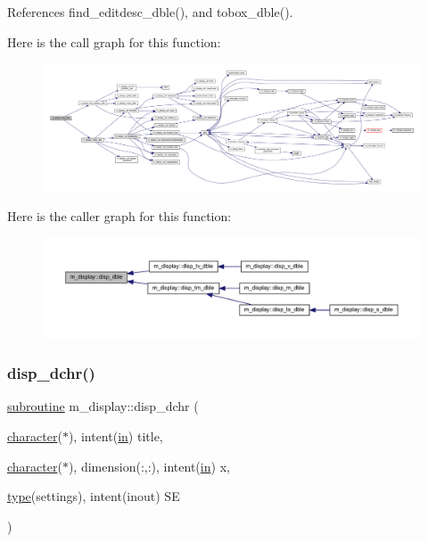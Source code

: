 References find\+\_\+editdesc\+\_\+dble(), and tobox\+\_\+dble().

Here is the call graph for this function\+:
\nopagebreak
\begin{figure}[H]
\begin{center}
\leavevmode
\includegraphics[width=350pt]{namespacem__display_a2d67bfdaf90a1173d8283050594c8efa_cgraph}
\end{center}
\end{figure}
Here is the caller graph for this function\+:
\nopagebreak
\begin{figure}[H]
\begin{center}
\leavevmode
\includegraphics[width=350pt]{namespacem__display_a2d67bfdaf90a1173d8283050594c8efa_icgraph}
\end{center}
\end{figure}
\mbox{\label{namespacem__display_a41b95f416778be093db3be49b2334570}} 
\subsubsection{\texorpdfstring{disp\+\_\+dchr()}{disp\_dchr()}}
{\footnotesize\ttfamily \hyperlink{M__stopwatch_83_8txt_acfbcff50169d691ff02d4a123ed70482}{subroutine} m\+\_\+display\+::disp\+\_\+dchr (\begin{DoxyParamCaption}\item[{\hyperlink{option__stopwatch_83_8txt_abd4b21fbbd175834027b5224bfe97e66}{character}($\ast$), intent(\hyperlink{M__journal_83_8txt_afce72651d1eed785a2132bee863b2f38}{in})}]{title,  }\item[{\hyperlink{option__stopwatch_83_8txt_abd4b21fbbd175834027b5224bfe97e66}{character}($\ast$), dimension(\+:,\+:), intent(\hyperlink{M__journal_83_8txt_afce72651d1eed785a2132bee863b2f38}{in})}]{x,  }\item[{\hyperlink{stop__watch_83_8txt_a70f0ead91c32e25323c03265aa302c1c}{type}(settings), intent(inout)}]{SE }\end{DoxyParamCaption})\hspace{0.3cm}{\ttfamily [private]}}



